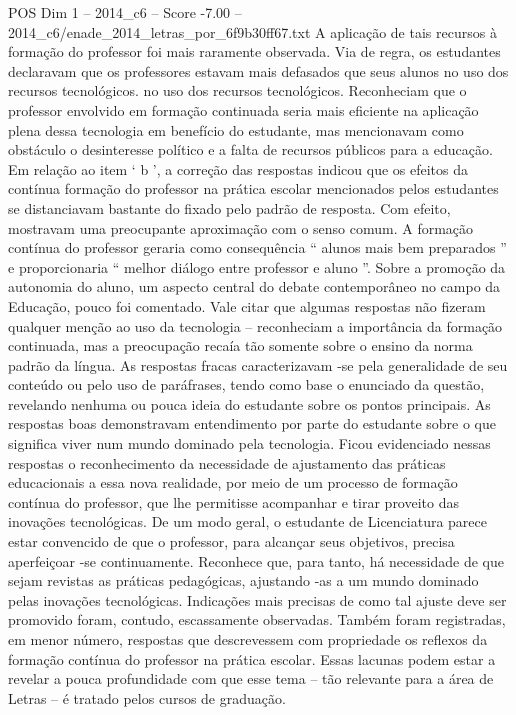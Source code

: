 \begin{textsample}{POS Dim 1 – 2014\_c6 – Score -7.00 – 2014\_c6/enade\_2014\_letras\_por\_6f9b30ff67.txt}
A aplicação de tais recursos à formação do professor foi mais raramente observada.
Via de regra, os estudantes declaravam que os professores estavam mais defasados que seus alunos no uso dos recursos tecnológicos. no uso dos recursos tecnológicos.
Reconheciam que o professor envolvido em formação continuada seria mais eficiente na aplicação plena dessa tecnologia em benefício do estudante, mas mencionavam como obstáculo o desinteresse político e a falta de recursos públicos para a educação.
Em relação ao item ‘ b ’, a correção das respostas indicou que os efeitos da contínua formação do professor na prática escolar mencionados pelos estudantes se distanciavam bastante do fixado pelo padrão de resposta.
Com efeito, mostravam uma preocupante aproximação com o senso comum.
A formação contínua do professor geraria como consequência “ alunos mais bem preparados ” e proporcionaria “ melhor diálogo entre professor e aluno ”.
Sobre a promoção da autonomia do aluno, um aspecto central do debate contemporâneo no campo da Educação, pouco foi comentado.
Vale citar que algumas respostas não fizeram qualquer menção ao uso da tecnologia – reconheciam a importância da formação continuada, mas a preocupação recaía tão somente sobre o ensino da norma padrão da língua.
As respostas fracas caracterizavam -se pela generalidade de seu conteúdo ou pelo uso de paráfrases, tendo como base o enunciado da questão, revelando nenhuma ou pouca ideia do estudante sobre os pontos principais.
As respostas boas demonstravam entendimento por parte do estudante sobre o que significa viver num mundo dominado pela tecnologia.
Ficou evidenciado nessas respostas o reconhecimento da necessidade de ajustamento das práticas educacionais a essa nova realidade, por meio de um processo de formação contínua do professor, que lhe permitisse acompanhar e tirar proveito das inovações tecnológicas.
De um modo geral, o estudante de Licenciatura parece estar convencido de que o professor, para alcançar seus objetivos, precisa aperfeiçoar -se continuamente.
Reconhece que, para tanto, há necessidade de que sejam revistas as práticas pedagógicas, ajustando -as a um mundo dominado pelas inovações tecnológicas.
Indicações mais precisas de como tal ajuste deve ser promovido foram, contudo, escassamente observadas.
Também foram registradas, em menor número, respostas que descrevessem com propriedade os reflexos da formação contínua do professor na prática escolar.
Essas lacunas podem estar a revelar a pouca profundidade com que esse tema – tão relevante para a área de Letras – é tratado pelos cursos de graduação.

\end{textsample}
